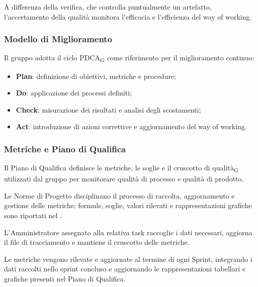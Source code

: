 A differenza della verifica, che controlla puntualmente un artefatto, l'accertamento
della qualità monitora l'efficacia e l'efficienza del way of working.


\subsubsection{Modello di Miglioramento}

Il gruppo adotta il ciclo PDCA\textsubscript{G} come riferimento per il miglioramento
continuo:

\begin{itemize}
    \item \textbf{Plan}: definizione di obiettivi, metriche e procedure;
    \item \textbf{Do}: applicazione dei processi definiti;
    \item \textbf{Check}: misurazione dei risultati e analisi degli scostamenti;
    \item \textbf{Act}: introduzione di azioni correttive e aggiornamento del way of working.
\end{itemize}


\subsubsection{Metriche e Piano di Qualifica}

Il Piano di Qualifica definisce le metriche, le soglie e il cruscotto di qualità\textsubscript{G}
utilizzati dal gruppo per monitorare qualità di processo e qualità di prodotto.

Le Norme di Progetto disciplinano il processo di raccolta, aggiornamento e gestione
delle metriche; formule, soglie, valori rilevati e rappresentazioni grafiche sono
riportati nel .

L'Amministratore assegnato alla relativa task raccoglie i dati necessari, aggiorna
il file di tracciamento e mantiene il cruscotto delle metriche.

Le metriche vengono rilevate e aggiornate al termine di ogni Sprint, integrando i dati raccolti nello
sprint concluso e aggiornando le rappresentazioni tabellari e grafiche presenti
nel Piano di Qualifica.

